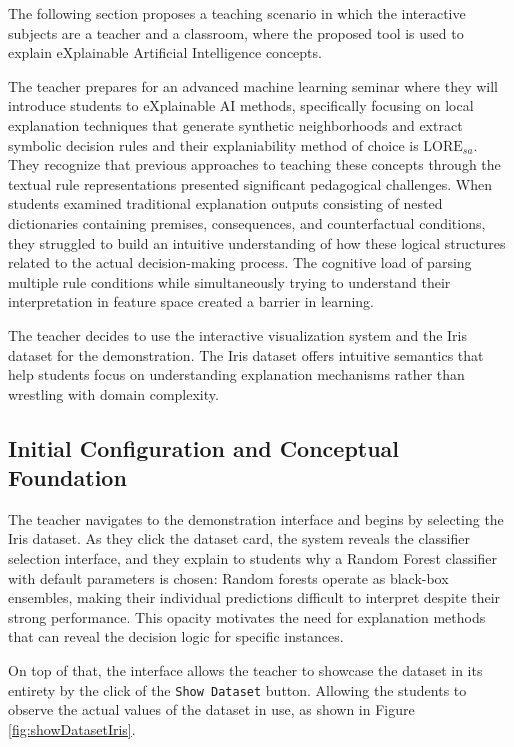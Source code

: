 

The following section proposes a teaching scenario in which the interactive subjects are a teacher and a classroom, where the proposed tool is used to explain eXplainable Artificial Intelligence concepts.

The teacher prepares for an advanced machine learning seminar where they will introduce students to eXplainable AI methods, specifically focusing on local explanation techniques that generate synthetic neighborhoods and extract symbolic decision rules and their explaniability method of choice is $\text{LORE}_{sa}$. 
They recognize that previous approaches to teaching these concepts through the textual rule representations presented significant pedagogical challenges. 
When students examined traditional explanation outputs consisting of nested dictionaries containing premises, consequences, and counterfactual conditions, they struggled to build an intuitive understanding of how these logical structures related to the actual decision-making process. The cognitive load of parsing multiple rule conditions while simultaneously trying to understand their interpretation in feature space created a barrier in learning.

The teacher decides to use the interactive visualization system and the Iris dataset for the demonstration. The Iris dataset offers intuitive semantics that help students focus on understanding explanation mechanisms rather than wrestling with domain complexity.

\subsection{Initial Configuration and Conceptual Foundation}

The teacher navigates to the demonstration interface and begins by selecting the Iris dataset. As they click the dataset card, the system reveals the classifier selection interface, and they explain to students why a Random Forest classifier with default parameters is chosen: Random forests operate as black-box ensembles, making their individual predictions difficult to interpret despite their strong performance. This opacity motivates the need for explanation methods that can reveal the decision logic for specific instances.

On top of that, the interface allows the teacher to showcase the dataset in its entirety by the click of the \texttt{Show Dataset} button. Allowing the students to observe the actual values of the dataset in use, as shown in Figure \ref{fig:showDatasetIris}.

